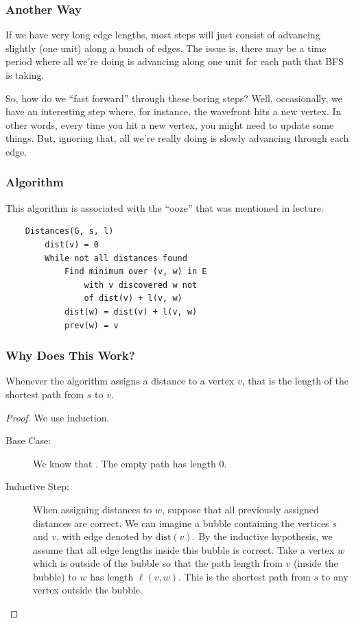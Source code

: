 \documentclass[letterpaper]{article}
\begin{document}
\subsubsection{Another Way}
If we have very long edge lengths, most steps will just consist of advancing slightly (one unit) along a bunch of edges. The issue is, there may be a time period where all we're doing is advancing along one unit for each path that BFS is taking. 

\bigskip 

So, how do we ``fast forward'' through these boring steps? Well, occasionally, we have an interesting step where, for instance, the wavefront hits a new vertex. In other words, every time you hit a new vertex, you might need to update some things. But, ignoring that, all we're really doing is slowly advancing through each edge. 

\subsubsection{Algorithm}
This algorithm is associated with the ``ooze'' that was mentioned in lecture. 
\begin{verbatim}
    Distances(G, s, l)
        dist(v) = 0
        While not all distances found 
            Find minimum over (v, w) in E
                with v discovered w not 
                of dist(v) + l(v, w)
            dist(w) = dist(v) + l(v, w)
            prev(w) = v
\end{verbatim}

\subsubsection{Why Does This Work?}
\begin{proposition}
    Whenever the algorithm assigns a distance to a vertex $v$, that is the length of the shortest path from $s$ to $v$. 
\end{proposition}

\begin{mdframed}[]
    \begin{proof}
        We use induction.
        \begin{description}
            \item[Base Case:] We know that . The empty path has length 0. 
            \item[Inductive Step:] When assigning distances to $w$, suppose that all previously assigned distances are correct. We can imagine a bubble containing the vertices $s$ and $v$, with edge denoted by $\text{dist}(v)$. By the inductive hypothesis, we assume that all edge lengths inside this bubble is correct. Take a vertex $w$ which is outside of the bubble so that the path length from $v$ (inside the bubble) to $w$ has length $\ell(v, w)$. This is the shortest path from $s$ to any vertex outside the bubble. 
        \end{description}
    \end{proof}
\end{mdframed}
\end{document}
